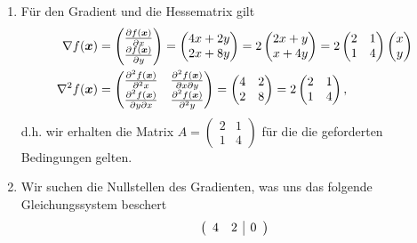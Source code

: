 \documentclass{exercise}
\begin{document}
	\begin{enumerate}
		\item Für den Gradient und die Hessematrix gilt
		\begin{align*}
			\nabla f\parentheses*{\bm{x}} &= \begin{pmatrix}
				\frac{\partial f\parentheses*{\bm{x}}}{\partial x}\\
				\frac{\partial f\parentheses*{\bm{x}}}{\partial y}
			\end{pmatrix} = \begin{pmatrix}
				4x + 2y\\
				2x + 8y
			\end{pmatrix} = 2\begin{pmatrix}
				2x + y\\
				x + 4y
			\end{pmatrix} = 2\begin{pmatrix}
				2 & 1\\
				1 & 4
			\end{pmatrix}\begin{pmatrix}
				x\\
				y
			\end{pmatrix}\\
			\nabla^2 f\parentheses*{\bm{x}} &= \begin{pmatrix}
				\frac{\partial^2 f\parentheses*{\bm{x}}}{\partial^2 x} & \frac{\partial^2 f\parentheses*{\bm{x}}}{\partial x\partial y}\\
				\frac{\partial^2 f\parentheses*{\bm{x}}}{\partial y\partial x} & \frac{\partial^2 f\parentheses*{\bm{x}}}{\partial^2 y}
			\end{pmatrix} = \begin{pmatrix}
				4 & 2\\
				2 & 8
			\end{pmatrix} = 2\begin{pmatrix}
				2 & 1\\
				1 & 4
			\end{pmatrix},
		\end{align*}
		d.h. wir erhalten die Matrix \(A = \begin{pmatrix}
			2 & 1\\
			1 & 4
		\end{pmatrix}\) für die die geforderten Bedingungen gelten.
		\item Wir suchen die Nullstellen des Gradienten, was uns das folgende Gleichungssystem beschert
		\[
			\parentheses*{\begin{array}{cc|c}
				4 & 2 & 0\\

\end{array}}\]
\end{enumerate}
\end{document}
